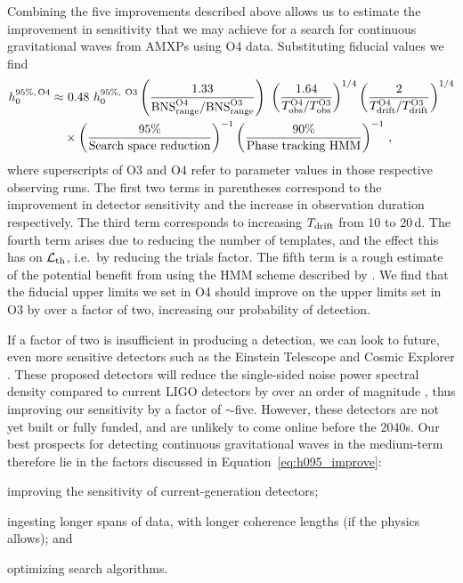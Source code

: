 Combining the five improvements described above allows us to estimate the improvement in sensitivity that we may achieve for a search for continuous gravitational waves from AMXPs using O4 data. Substituting fiducial values we find
\begin{align}
    h_0^{95\%,\,\textrm{O4}} \approx&~ 0.48\ h_0^{95\%,\ \textrm{O3}} 
                                    \left(\frac{1.33}{\textrm{BNS}_{\rm range}^{\rm O4} / \textrm{BNS}_{\rm range}^{\rm O3}}\right)\ 
                                    \left(\frac{1.64}{T_{\rm obs}^{\rm O4} / T_{\rm obs}^{\rm O3}}\right)^{1/4} 
                                    \left(\frac{2}{T_{\rm drift}^{\rm O4} / T_{\rm drift}^{\rm O3}}\right)^{1/4} \nonumber \\ 
                                    &\times \left(\frac{95\%}{\textrm{Search space reduction}}\right)^{-1} 
                                    \left(\frac{90\%}{\textrm{Phase tracking HMM}}\right)^{-1}\,,  \label{eq:h095_improve}
\end{align}
where superscripts of O3 and O4 refer to parameter values in those respective observing runs. The first two terms in parentheses correspond to the improvement in detector sensitivity and the increase in observation duration respectively. The third term corresponds to increasing $T_{\rm drift}$ from 10 to 20\,d. The fourth term arises due to reducing the number of templates, and the effect this has on $\mathcal{L}_{\rm th}$, i.e.~by reducing the trials factor. The fifth term is a rough estimate of the potential benefit from using the HMM scheme described by \citet{Melatos2021}. We find that the fiducial upper limits we set in O4 should improve on the upper limits set in O3 by over a factor of two, increasing our probability of detection. 

If a factor of two is insufficient in producing a detection, we can look to future, even more sensitive detectors such as the Einstein Telescope \citep{Punturo2010} and Cosmic Explorer \citep{ce2017}. These proposed detectors will reduce the single-sided noise power spectral density compared to current LIGO detectors by over an order of magnitude \citep{Punturo2010,ce2017}, thus improving our sensitivity by a factor of $\sim$five. However, these detectors are not yet built or fully funded, and are unlikely to come online before the 2040s. Our best prospects for detecting continuous gravitational waves in the medium-term therefore lie in the factors discussed in Equation~\eqref{eq:h095_improve}: \begin{enumerate*} 
\item improving the sensitivity of current-generation detectors;
\item ingesting longer spans of data, with longer coherence lengths (if the physics allows); and
\item optimizing search algorithms.
\end{enumerate*}